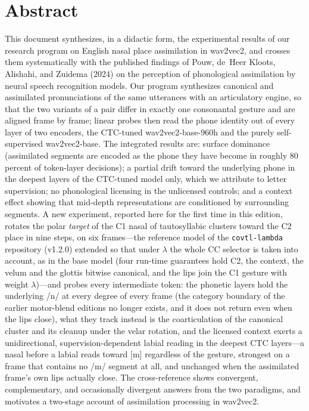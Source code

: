 \documentclass[11pt,a4paper]{article}
\newcommand{\lam}{\lambda}
\begin{document}
\tableofcontents
\newpage

\section*{Abstract}
\noindent
This document synthesizes, in a didactic form, the experimental results
of our research program on English nasal place assimilation in
wav2vec2, and crosses them systematically with the published findings of
Pouw, de~Heer Kloots, Alishahi, and Zuidema (2024) on the perception of
phonological assimilation by neural speech recognition models. Our
program synthesizes canonical and assimilated pronunciations of the
same utterances with an articulatory engine, so that the two variants of
a pair differ in exactly one consonantal gesture and are aligned frame
by frame; linear probes then read the phone identity out of every layer
of two encoders, the CTC-tuned wav2vec2-base-960h and the purely
self-supervised wav2vec2-base. The integrated results are: surface
dominance (assimilated segments are encoded as the phone they have
become in roughly 80 percent of token-layer decisions); a partial drift
toward the underlying phone in the deepest layers of the CTC-tuned
model only, which we attribute to letter supervision; no phonological
licensing in the unlicensed controls; and a context effect showing that
mid-depth representations are conditioned by surrounding segments. A
new experiment, reported here for the first time in this edition,
rotates the polar \emph{target} of the C1 nasal of tautosyllabic
clusters toward the C2 place in nine steps, on six frames---the
reference model of the \texttt{covtl-lambda} repository (v1.2.0)
extended so that under $\lam$ the whole CC selector is taken into
account, as in the base model (four run-time guarantees hold C2, the
context, the velum and the glottis bitwise canonical, and the lips
join the C1 gesture with weight $\lam$)---and probes every
intermediate token: the phonetic layers hold the underlying /n/ at
every degree of every frame (the category boundary of the earlier
motor-blend editions no longer exists, and it does not return even
when the lips close), what they track instead is the coarticulation
of the canonical cluster and its cleanup under the velar rotation,
and the licensed context exerts a unidirectional,
supervision-dependent labial reading in the deepest CTC layers---a
nasal before a labial reads toward [m] regardless of the gesture,
strongest on a frame that contains no /m/ segment at all, and
unchanged when the assimilated frame's own lips actually close. The
cross-reference shows convergent, complementary, and occasionally
divergent answers from the two paradigms, and motivates a two-stage
account of assimilation processing in wav2vec2.
\end{document}
